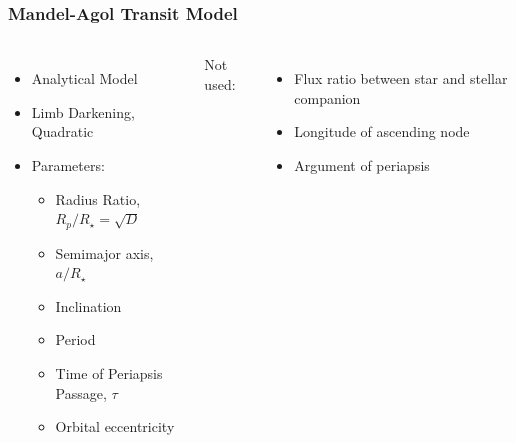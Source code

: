 \documentclass[notes]{beamer}
\begin{document}
\begin{frame}
\frametitle{Mandel-Agol Transit Model}
\begin{columns}
	\begin{itemize}
		\item Analytical Model
		\item Limb Darkening, Quadratic
		\item Parameters:
		\begin{itemize}
			\item Radius Ratio, $ R_p/R_{\star} = \sqrt{D} $
			\item Semimajor axis, $ a/R_{\star} $
			\item Inclination
			\item Period
			\item Time of Periapsis Passage, $ \tau $
			\item Orbital eccentricity
		\end{itemize}
	\end{itemize}
	Not used:
	\begin{itemize}
		\item Flux ratio between star and stellar companion
		\item Longitude of ascending node
		\item Argument of periapsis
	\end{itemize}
\end{columns}
\end{frame}
\end{document}
